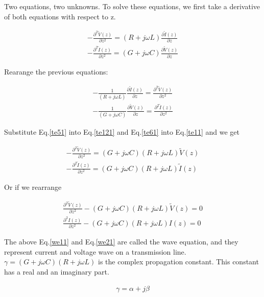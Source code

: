 \documentclass{ximera}
\begin{document}
Two equations, two unknowns. To solve these equations, we first
take a derivative of  both equations with respect to  z. 

\begin{eqnarray}
-\frac{\partial^2 \tilde{V}(z)}{\partial z^2}=  (R+j\omega L) \frac{\partial
 \tilde{I}(z)}{\partial z}  \label{teleg3} \\
-\frac{\partial^2 \tilde{I}(z)}{\partial z^2}=  (G+j\omega C) \frac{\partial
 \tilde{V}(z)}{\partial z} \label{teleg4}
\end{eqnarray}

Rearange the previous equations:



\begin{eqnarray}
- \frac{1}{ (R+j\omega L)} \frac{\partial \tilde{I}(z)}{\partial z}= \frac{\partial^2
  \tilde{V}(z)}{\partial z^2} \label{te51} \\
-\frac{1}{ (G+j\omega C)} \frac{\partial \tilde{V}(z)}{\partial z}= \frac{\partial^2
  \tilde{I}(z)}{\partial z^2} \label{te61}
\end{eqnarray}

Substitute  Eq.\ref{te51} into  Eq.\ref{te121}
and Eq.\ref{te61} into Eq.\ref{te11} and we get

\begin{eqnarray}
-\frac{\partial^2 \tilde{V}(z)}{\partial z^2}=(G+j\omega C)(R+j\omega L) \tilde{V}(z) \label{teleg1} \\
-\frac{\partial^2 \tilde{I}(z)}{\partial z^2}= (G+j\omega C)  (R+j\omega L) \label{teleg2}
\tilde{I}(z) 
\end{eqnarray}

Or if we rearrange


\begin{eqnarray}
\frac{\partial^2 \tilde{V}(z)}{\partial z^2} -(G+j\omega C)(R+j\omega L)
 \tilde{V}(z)=0  \label{we11} \\ 
\frac{\partial^2 I(z)}{\partial z^2}- (G+j\omega C)  (R+j\omega L)
I(z)=0 \label{we21}
\end{eqnarray}

The above Eq.\ref{we11} and Eq.\ref{we21} are called the wave equation, and  they represent
current and voltage wave on a transmission line. $\gamma=(G+j\omega
C)(R+j\omega L)$ is the complex propagation constant. This constant
has a real and an imaginary part.

\begin{eqnarray}
\gamma= \alpha + j \beta \nonumber
\end{eqnarray}
\end{document}
